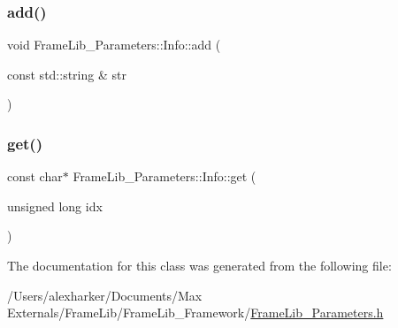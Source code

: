 \mbox{\label{class_frame_lib___parameters_1_1_info_ae5b7b0ee9401ba93b5a15cc25f0f7863}} 
\subsubsection{\texorpdfstring{add()}{add()}\hspace{0.1cm}{\footnotesize\ttfamily [2/2]}}
{\footnotesize\ttfamily void Frame\+Lib\+\_\+\+Parameters\+::\+Info\+::add (\begin{DoxyParamCaption}\item[{const std\+::string \&}]{str }\end{DoxyParamCaption})\hspace{0.3cm}{\ttfamily [inline]}}

\mbox{\label{class_frame_lib___parameters_1_1_info_a1f1518215e8de95d2e587de919ff47f0}} 
\subsubsection{\texorpdfstring{get()}{get()}}
{\footnotesize\ttfamily const char$\ast$ Frame\+Lib\+\_\+\+Parameters\+::\+Info\+::get (\begin{DoxyParamCaption}\item[{unsigned long}]{idx }\end{DoxyParamCaption})\hspace{0.3cm}{\ttfamily [inline]}}



The documentation for this class was generated from the following file\+:\begin{DoxyCompactItemize}
\item 
/\+Users/alexharker/\+Documents/\+Max Externals/\+Frame\+Lib/\+Frame\+Lib\+\_\+\+Framework/\hyperlink{_frame_lib___parameters_8h}{Frame\+Lib\+\_\+\+Parameters.\+h}\end{DoxyCompactItemize}
